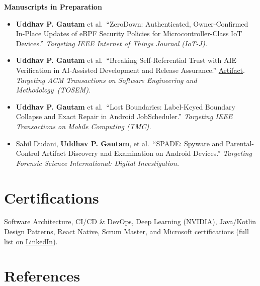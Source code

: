 \documentclass[10pt]{article}
\newcommand{\thread}[1]{%
 \par\needspace{3\baselineskip}\vspace{14pt}%
 {\noindent\fontsize{11}{13}\selectfont\bfseries #1\par}%
}
\newcommand{\cvsection}[1]{\needspace{5\baselineskip}\section*{#1}}
\newcommand{\refsize}{\fontsize{9.5}{11.5}\selectfont}
\begin{document}
\thread{Manuscripts in Preparation}
\begin{itemize}\refsize
 \item \textbf{Uddhav P. Gautam} et al.\ ``ZeroDown: Authenticated, Owner-Confirmed In-Place Updates
 of eBPF Security Policies for Microcontroller-Class IoT Devices.'' \textit{Targeting IEEE Internet of Things Journal (IoT-J).}
 \item \textbf{Uddhav P. Gautam} et al.\ ``Breaking Self-Referential Trust with AIE Verification in
 AI-Assisted Development and Release Assurance.'' \href{https://figshare.com/s/d0871296649a28ecd956}{Artifact}.
 \textit{Targeting ACM Transactions on Software Engineering and Methodology~(TOSEM).}
 \item \textbf{Uddhav P. Gautam} et al.\ ``Lost Boundaries: Label-Keyed Boundary Collapse and Exact
 Repair in Android JobScheduler.'' \textit{Targeting IEEE Transactions on Mobile Computing (TMC).}
 \item Sahil Dudani, \textbf{Uddhav P. Gautam}, et al.\ ``SPADE: Spyware and Parental-Control Artifact
 Discovery and Examination on Android Devices.'' \textit{Targeting Forensic Science International: Digital Investigation.}
\end{itemize}

\cvsection{Certifications}
\noindent
{\small Software Architecture, CI/CD \& DevOps, Deep Learning (NVIDIA), Java/Kotlin Design Patterns,
React Native, Scrum Master, and Microsoft certifications
(full list on \href{https://www.linkedin.com/in/uddhavpgautam/}{LinkedIn}).}

\cvsection{References}
{\refsize

}
\end{document}
